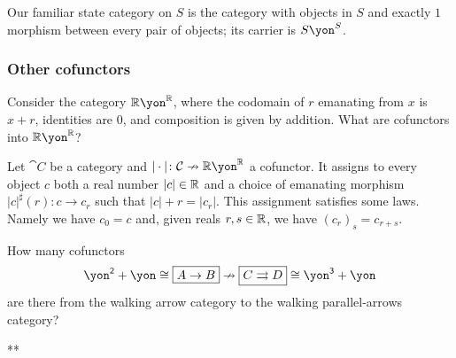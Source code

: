 \documentclass[Book-Poly]{subfiles}
\begin{document}

\begin{example}
Our familiar state category on $S$ is the category with objects in $S$ and exactly $1$ morphism between every pair of objects; its carrier is $S\yon^S$.
\end{example}


\subsubsection{Other cofunctors}

\begin{example}\label{ex.cof_to_rr}
Consider the category $\rr\yon^\rr$, where the codomain of $r$ emanating from $x$ is $x+r$, identities are $0$, and composition is given by addition. What are cofunctors into $\rr\yon^\rr$?

Let $\cat{C}$ be a category and $|\cdot|\colon\cat{C}\cof\rr\yon^\rr$ a cofunctor. It assigns to every object $c$ both a real number $|c|\in\mathbb{R}$ and a choice of emanating morphism $|c|^\sharp(r)\colon c\to c_r$ such that $|c|+r=|c_r|$. This assignment satisfies some laws. Namely we have $c_0=c$ and, given reals $r,s\in\mathbb{R}$, we have $(c_r)_s=c_{r+s}$. 
\end{example}


\begin{exercise} %
How many cofunctors
\[
    \yon^\2+\yon\iso\fbox{$A\to B$}\cof\fbox{$C\tto D$}\iso\yon^\3+\yon
\]
are there from the walking arrow category to the walking parallel-arrows category?
\begin{solution}
**
\end{solution}
\end{exercise}
\end{document}
